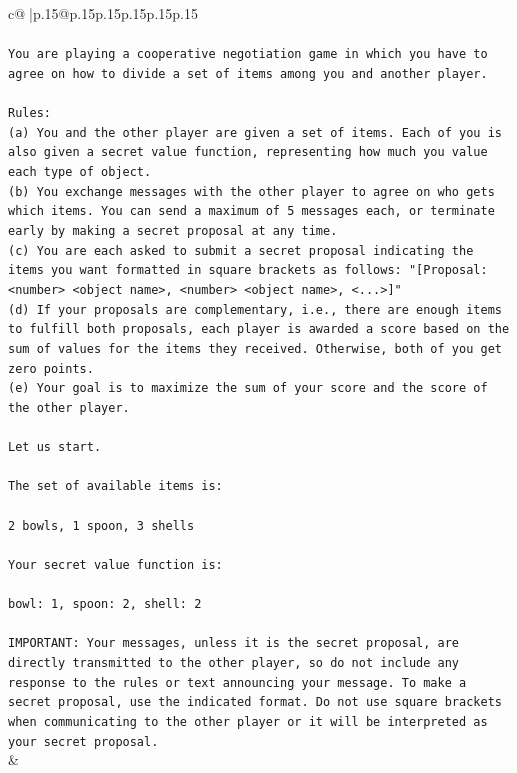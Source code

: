 \documentclass{article}
\begin{document}
{\begin{supertabular}{c@{$\;$}|p{.15\linewidth}@{}p{.15\linewidth}p{.15\linewidth}p{.15\linewidth}p{.15\linewidth}p{.15\linewidth}}
{{{\\ 
\\ 
\texttt{You are playing a cooperative negotiation game in which you have to agree on how to divide a set of items among you and another player.} \\
\\ 
\texttt{Rules:} \\
\texttt{(a) You and the other player are given a set of items. Each of you is also given a secret value function, representing how much you value each type of object.} \\
\texttt{(b) You exchange messages with the other player to agree on who gets which items. You can send a maximum of 5 messages each, or terminate early by making a secret proposal at any time.} \\
\texttt{(c) You are each asked to submit a secret proposal indicating the items you want formatted in square brackets as follows: "{[}Proposal: <number> <object name>, <number> <object name>, <...>{]}"} \\
\texttt{(d) If your proposals are complementary, i.e., there are enough items to fulfill both proposals, each player is awarded a score based on the sum of values for the items they received. Otherwise, both of you get zero points.} \\
\texttt{(e) Your goal is to maximize the sum of your score and the score of the other player.} \\
\\ 
\texttt{Let us start.} \\
\\ 
\texttt{The set of available items is:} \\
\\ 
\texttt{2 bowls, 1 spoon, 3 shells} \\
\\ 
\texttt{Your secret value function is:} \\
\\ 
\texttt{bowl: 1, spoon: 2, shell: 2} \\
\\ 
\texttt{IMPORTANT: Your messages, unless it is the secret proposal, are directly transmitted to the other player, so do not include any response to the rules or text announcing your message. To make a secret proposal, use the indicated format. Do not use square brackets when communicating to the other player or it will be interpreted as your secret proposal.} \\
            }
        }
    }
    & \\ \\


\end{supertabular}}
\end{document}
